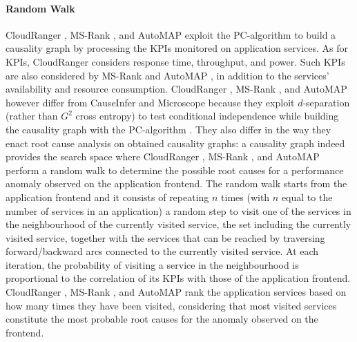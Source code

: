 \paragraph{{Random Walk}}
CloudRanger \cite{29_Wang2018_CloudRanger}, MS-Rank \cite{07_Ma2019_MSRank,25_Ma2020_MSRankExtended}, and AutoMAP \cite{08_Ma2020_AutoMAP} exploit the PC-algorithm to build a causality graph by processing the KPIs monitored on application services.
As for KPIs, CloudRanger \cite{29_Wang2018_CloudRanger} considers response time, throughput, and power.
Such KPIs are also considered by MS-Rank \cite{07_Ma2019_MSRank,25_Ma2020_MSRankExtended} and AutoMAP \cite{08_Ma2020_AutoMAP}, in addition to the services' availability and resource consumption.
CloudRanger \cite{29_Wang2018_CloudRanger}, MS-Rank \cite{07_Ma2019_MSRank,25_Ma2020_MSRankExtended}, and AutoMAP \cite{08_Ma2020_AutoMAP} however differ from CauseInfer \cite{40_Chen2020_CauseInfer} and Microscope \cite{06_Lin2018_Microscope,19_Guan2019_MicroscopeDemo} because they exploit $d$-separation \cite{Cohen2005_DSeparation} (rather than $G^2$ cross entropy) to test conditional independence while building the causality graph with the PC-algorithm \cite{Spirtes2000_CausationPredictionSearchPCAlgoritm}.
They also differ in the way they enact root cause analysis on obtained causality graphs:
a causality graph indeed provides the search space where CloudRanger \cite{29_Wang2018_CloudRanger}, MS-Rank \cite{07_Ma2019_MSRank,25_Ma2020_MSRankExtended}, and AutoMAP \cite{08_Ma2020_AutoMAP} perform a random walk to determine the possible root causes for a performance anomaly observed on the application frontend. 
The random walk starts from the application frontend and it consists of repeating $n$ times (with $n$ equal to the number of services in an application) a random step to visit one of the services in the neighbourhood of the currently visited service, \viz the set including the currently visited service, together with the services that can be reached by traversing forward/backward arcs connected to the currently visited service.
At each iteration, the probability of visiting a service in the neighbourhood is proportional to the correlation of its KPIs with those of the application frontend. 
CloudRanger \cite{29_Wang2018_CloudRanger}, MS-Rank \cite{07_Ma2019_MSRank,25_Ma2020_MSRankExtended}, and AutoMAP \cite{08_Ma2020_AutoMAP} rank the application services based on how many times they have been visited, considering that most visited services constitute the most probable root causes for the anomaly observed on the frontend.

